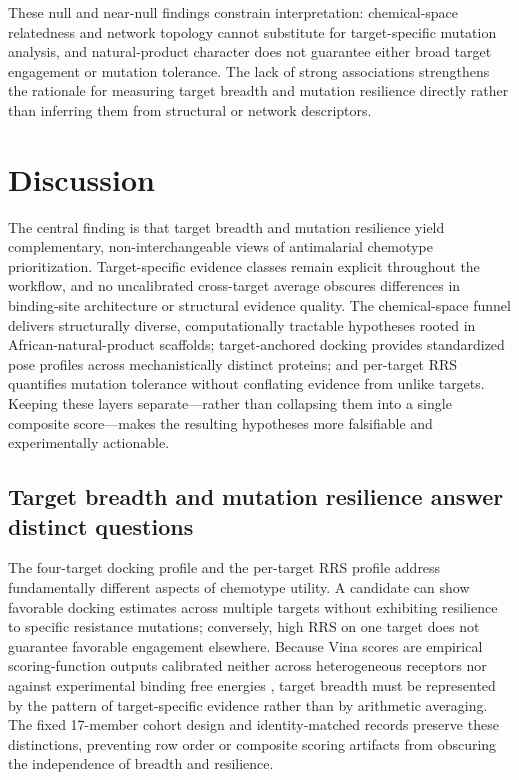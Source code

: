 \documentclass[journal=jcisd8,manuscript=article]{achemso}
\begin{document}
These null and near-null findings constrain interpretation: chemical-space relatedness and network topology cannot substitute for target-specific mutation analysis, and natural-product character does not guarantee either broad target engagement or mutation tolerance. The lack of strong associations strengthens the rationale for measuring target breadth and mutation resilience directly rather than inferring them from structural or network descriptors.

\section{Discussion}
The central finding is that target breadth and mutation resilience yield complementary, non-interchangeable views of antimalarial chemotype prioritization. Target-specific evidence classes remain explicit throughout the workflow, and no uncalibrated cross-target average obscures differences in binding-site architecture or structural evidence quality. The chemical-space funnel delivers structurally diverse, computationally tractable hypotheses rooted in African-natural-product scaffolds; target-anchored docking provides standardized pose profiles across mechanistically distinct proteins; and per-target RRS quantifies mutation tolerance without conflating evidence from unlike targets. Keeping these layers separate—rather than collapsing them into a single composite score—makes the resulting hypotheses more falsifiable and experimentally actionable.

\subsection{Target breadth and mutation resilience answer distinct questions}
The four-target docking profile and the per-target RRS profile address fundamentally different aspects of chemotype utility. A candidate can show favorable docking estimates across multiple targets without exhibiting resilience to specific resistance mutations; conversely, high RRS on one target does not guarantee favorable engagement elsewhere. Because Vina scores are empirical scoring-function outputs calibrated neither across heterogeneous receptors nor against experimental binding free energies \cite{Quiroga2016}, target breadth must be represented by the pattern of target-specific evidence rather than by arithmetic averaging. The fixed 17-member cohort design and identity-matched records preserve these distinctions, preventing row order or composite scoring artifacts from obscuring the independence of breadth and resilience.
\end{document}
